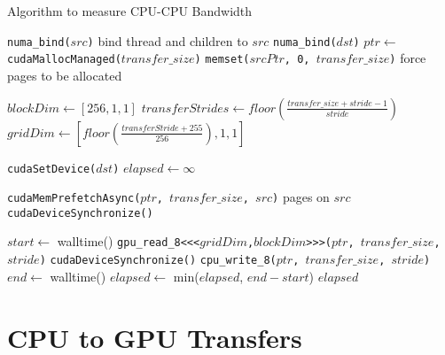 \begin{algorithm}
    \caption{Algorithm to measure CPU-CPU Bandwidth}
    \label{alg:um-coherence-bw}
    \begin{algorithmic}[1]
    \Statex
        \State \Return 
    \EndFunction
    \Statex
        \State \Return 
    \EndFunction
    \Statex

            \State \texttt{numa\_bind($src$)} \Comment bind thread and children to $src$
        \EndIf
        \State \texttt{numa\_bind($dst$)}
        \EndIf
        \State $ptr \gets$ \texttt{cudaMallocManaged($transfer\_size$)}
        \State \texttt{memset($srcPtr$, 0, $transfer\_size$)} \Comment force pages to be allocated
        

        \State $blockDim \gets [256,1,1]$
        \State $transferStrides \gets floor(\frac{transfer\_size + stride - 1}{stride})$
        \State $gridDim \gets [floor(\frac{transferStride + 255}{256}), 1, 1]$

            \State \texttt{cudaSetDevice($dst$)}
        \EndIf
        \State $elapsed \gets \infty$

            \State \texttt{cudaMemPrefetchAsync($ptr$, $transfer\_size$, $src$)} \Comment pages on $src$
            \State \texttt{cudaDeviceSynchronize()}

            \State $start \gets$ walltime()
                \State \texttt{gpu\_read\_8<<<$gridDim$,$blockDim$>>>($ptr$, $transfer\_size$, $stride$)}
                \State \texttt{cudaDeviceSynchronize()}
            \Else
                \State \texttt{cpu\_write\_8($ptr$, $transfer\_size$, $stride$)}
            \EndIf
            \State $end \gets$ walltime()
            \State $elapsed \gets$ min($elapsed$, $end-start$)
        \EndFor
        \State \Return $elapsed$
    \EndFunction

    \end{algorithmic}
\end{algorithm}

\section{CPU to GPU Transfers}
\label{sec:um-cpu-gpu}

